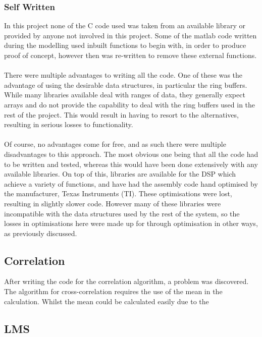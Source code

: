 \subsubsection{Self Written}
In this project none of the C code used was taken from an available library or provided by anyone not involved in this project.
Some of the matlab code written during the modelling used inbuilt functions to begin with, in order to produce proof of concept, however then was re-written to remove these external functions.
\\
\\
There were multiple advantages to writing all the code.
One of these was the advantage of using the desirable data structures, in particular the ring buffers.
While many libraries available deal with ranges of data, they generally expect arrays and do not provide the capability to deal with the ring buffers used in the rest of the project.
This would result in having to resort to the alternatives, resulting in serious losses to functionality.
\\
\\
Of course, no advantages come for free, and as such there were multiple disadvantages to this approach.
The most obvious one being that all the code had to be written and tested, whereas this would have been done extensively with any available libraries.
On top of this, libraries are available for the DSP which achieve a variety of functions, and have had the assembly code hand optimised by the manufacturer, Texas Instruments (TI).
These optimisations were lost, resulting in slightly slower code.
However many of these libraries were incompatible with the data structures used by the rest of the system, so the losses in optimisations here were made up for through optimisation in other ways, as previously discussed.

\subsection{Correlation}

After writing the code for the correlation algorithm, a problem was discovered.
The algorithm for cross-correlation requires the use of the mean in the calculation.
Whilst the mean could be calculated easily due to the 

\subsection{LMS}

